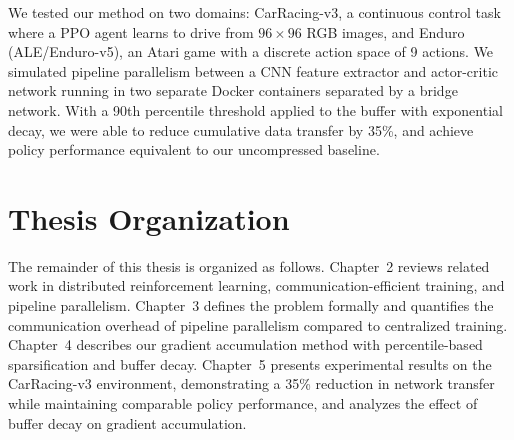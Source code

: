 We tested our method on two domains: CarRacing-v3, a continuous control task where a PPO agent learns to drive from $96 \times 96$ RGB images, and Enduro (ALE/Enduro-v5), an Atari game with a discrete action space of 9 actions. We simulated pipeline parallelism between a CNN feature extractor and actor-critic network running in two separate Docker containers separated by a bridge network. With a 90th percentile threshold applied to the buffer with exponential decay, we were able to reduce cumulative data transfer by 35\%, and achieve policy performance equivalent to our uncompressed baseline.

\section{Thesis Organization}

The remainder of this thesis is organized as follows. Chapter~2 reviews related work in distributed reinforcement learning, communication-efficient training, and pipeline parallelism. Chapter~3 defines the problem formally and quantifies the communication overhead of pipeline parallelism compared to centralized training. Chapter~4 describes our gradient accumulation method with percentile-based sparsification and buffer decay. Chapter~5 presents experimental results on the CarRacing-v3 environment, demonstrating a 35\% reduction in network transfer while maintaining comparable policy performance, and analyzes the effect of buffer decay on gradient accumulation.
